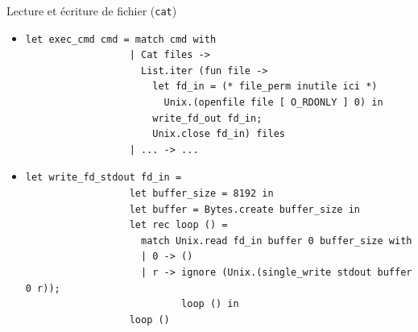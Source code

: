 \begin{frame}[fragile]{Lecture et écriture de fichier (\texttt{cat})}
    \begin{itemize}[leftmargin=-10pt]
        \item<2->
            \begin{lstlisting}[basicstyle=\footnotesize\ttfamily]
                let exec_cmd cmd = match cmd with 
                  | Cat files -> 
                    List.iter (fun file ->
                      let fd_in = (* file_perm inutile ici *)
                        Unix.(openfile file [ O_RDONLY ] 0) in
                      write_fd_out fd_in;
                      Unix.close fd_in) files
                  | ... -> ...   
        \end{lstlisting}
        \item<3->
            \begin{lstlisting}[basicstyle=\footnotesize\ttfamily]
                let write_fd_stdout fd_in =
                  let buffer_size = 8192 in
                  let buffer = Bytes.create buffer_size in
                  let rec loop () =
                    match Unix.read fd_in buffer 0 buffer_size with
                    | 0 -> ()
                    | r -> ignore (Unix.(single_write stdout buffer 0 r));
                           loop () in
                  loop ()
            \end{lstlisting}
     \end{itemize}
\end{frame}